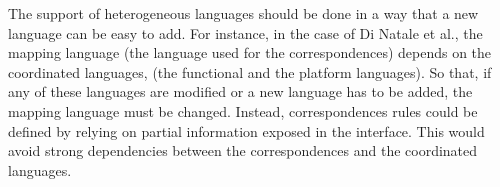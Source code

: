 The support of heterogeneous languages should be done in a way that a new language can be easy to add. For instance, in the case of Di Natale et al., the mapping language (\ie the language used for the correspondences) depends on the coordinated languages, (\ie the functional and the platform languages). So that, if any of these languages are modified or a new language has to be added, the mapping language must be changed. Instead, correspondences rules could be defined by relying on partial information exposed in the interface. This would avoid strong dependencies between the correspondences and the coordinated languages.







